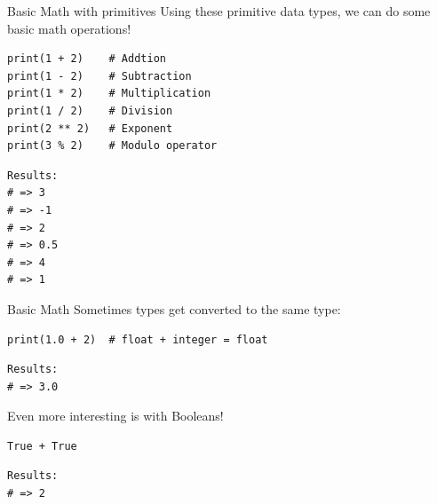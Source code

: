 \documentclass[10pt]{beamer}
\begin{document}
\begin{frame}[label={sec:org6921939},fragile]{Basic Math with primitives}
 Using these primitive data types, we can do some basic math operations!

\begin{verbatim}
print(1 + 2)    # Addtion
print(1 - 2)    # Subtraction
print(1 * 2)    # Multiplication
print(1 / 2)    # Division
print(2 ** 2)   # Exponent
print(3 % 2)    # Modulo operator
\end{verbatim}

\begin{verbatim}
Results: 
# => 3
# => -1
# => 2
# => 0.5
# => 4
# => 1
\end{verbatim}
\end{frame}

\begin{frame}[label={sec:org7e8de7a},fragile]{Basic Math}
 Sometimes types get converted to the same type:

\begin{verbatim}
print(1.0 + 2)  # float + integer = float
\end{verbatim}

\begin{verbatim}
Results: 
# => 3.0
\end{verbatim}


Even more interesting is with Booleans!

\begin{verbatim}
True + True
\end{verbatim}

\begin{verbatim}
Results: 
# => 2
\end{verbatim}
\end{frame}
\end{document}
